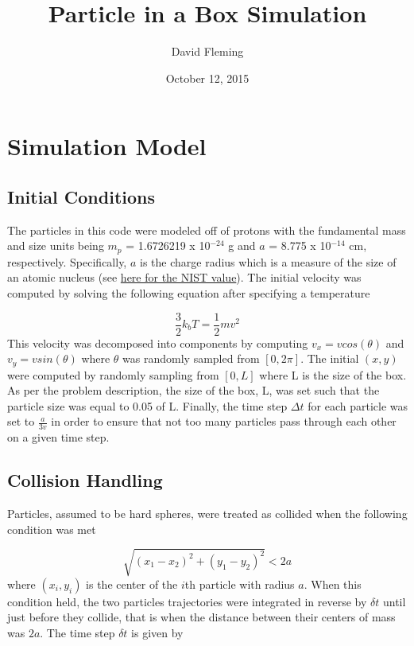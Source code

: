 \documentclass[12pt]{amsart}
\title{Particle in a Box Simulation}
\author{David Fleming}
\date{October 12, 2015} %
\begin{document}
\maketitle


\section{Simulation Model}
\subsection{Initial Conditions}

The particles in this code were modeled off of protons with the fundamental mass and size units being $m_p$ = 1.6726219 x 10$^{-24}$ g and $a$ = 8.775 x 10$^{-14}$ cm, respectively.  Specifically, $a$ is the charge radius which is a measure of the size of an atomic nucleus (see \href{http://physics.nist.gov/cgi-bin/cuu/Value?rp}{here for the NIST value}).  The initial velocity was computed by solving the following equation after specifying a temperature 

$$ \frac{3}{2} k_b T = \frac{1}{2} m v^2 $$
\newline
  This velocity was decomposed into components by computing $v_x = vcos(\theta)$ and $v_y = vsin(\theta)$ where $\theta$ was randomly sampled from $[0,2 \pi]$. The initial $(x,y)$  were computed by randomly sampling from $[0,L]$ where L is the size of the box.  As per the problem description, the size of the box, L, was set such that the particle size was equal to 0.05 of L.  Finally, the time step $\Delta t$ for each particle was set to $\frac{a}{3v}$ in order to ensure that not too many particles pass through each other on a given time step.

\subsection{Collision Handling}

Particles, assumed to be hard spheres, were treated as collided when the following condition was met

$$ \sqrt{(x_1 - x_2)^2 + (y_1 - y_2)^2} < 2a  $$ 
\newline
where $(x_i,y_i)$ is the center of the $i$th particle with radius $a$.  When this condition held, the two particles trajectories were integrated in reverse by $\delta t$ until just before they collide, that is when the distance between their centers of mass was $2a$.  The time step $\delta t$ is given by 
\end{document}

